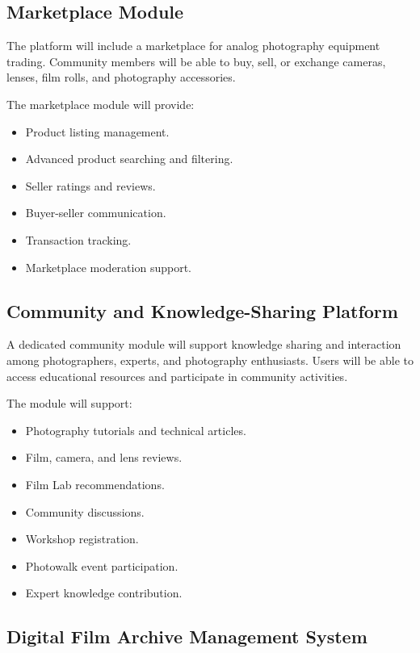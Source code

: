 \subsection{Marketplace Module}

The platform will include a marketplace for analog photography equipment trading. Community members will be able to buy, sell, or exchange cameras, lenses, film rolls, and photography accessories.

The marketplace module will provide:

\begin{itemize}
    \item Product listing management.
    \item Advanced product searching and filtering.
    \item Seller ratings and reviews.
    \item Buyer-seller communication.
    \item Transaction tracking.
    \item Marketplace moderation support.
\end{itemize}

\subsection{Community and Knowledge-Sharing Platform}

A dedicated community module will support knowledge sharing and interaction among photographers, experts, and photography enthusiasts. Users will be able to access educational resources and participate in community activities.

The module will support:

\begin{itemize}
    \item Photography tutorials and technical articles.
    \item Film, camera, and lens reviews.
    \item Film Lab recommendations.
    \item Community discussions.
    \item Workshop registration.
    \item Photowalk event participation.
    \item Expert knowledge contribution.
\end{itemize}

\subsection{Digital Film Archive Management System}

